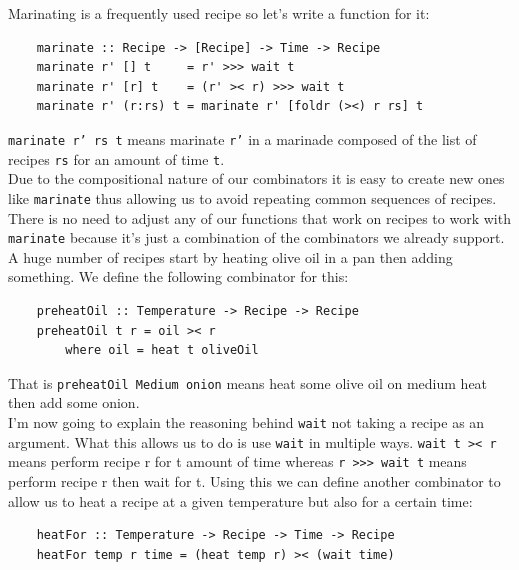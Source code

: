 \documentclass[11pt]{article}
\begin{document}
    Marinating is a frequently used recipe so let's write a function for it:
    \begin{tt}
    \small
    \begin{lstlisting}
    marinate :: Recipe -> [Recipe] -> Time -> Recipe
    marinate r' [] t     = r' >>> wait t
    marinate r' [r] t    = (r' >< r) >>> wait t
    marinate r' (r:rs) t = marinate r' [foldr (><) r rs] t
    \end{lstlisting}
    \end{tt}
    \texttt{marinate r' rs t} means marinate \texttt{r'} in a marinade composed
    of the list of recipes \texttt{rs} for an amount of time \texttt{t}. \\

    Due to the compositional nature of our combinators it is easy to create new
    ones like \texttt{marinate} thus allowing us to avoid repeating common
    sequences of recipes. There is no need to adjust any of our functions that
    work on recipes to work with \texttt{marinate} because it's just a combination
    of the combinators we already support. \\

    A huge number of recipes start by heating olive oil in a pan then adding something.
    We define the following combinator for this:
    \begin{tt}
    \small
    \begin{lstlisting}
    preheatOil :: Temperature -> Recipe -> Recipe
    preheatOil t r = oil >< r
        where oil = heat t oliveOil
    \end{lstlisting}
    \end{tt}
    That is \texttt{preheatOil Medium onion} means heat some olive oil on medium heat
    then add some onion. \\

    I'm now going to explain the reasoning behind \texttt{wait} not taking a recipe as
    an argument. What this allows us to do is use \texttt{wait} in multiple ways.
    \texttt{wait t >< r} means perform recipe r for t amount of time whereas
    \texttt{r >>> wait t} means perform recipe r then wait for t. Using this we
    can define another combinator to allow us to heat a recipe at a given temperature
    but also for a certain time:
    \begin{tt}
    \small
    \begin{lstlisting}
    heatFor :: Temperature -> Recipe -> Time -> Recipe
    heatFor temp r time = (heat temp r) >< (wait time)
    \end{lstlisting}
    \end{tt}
\end{document}
